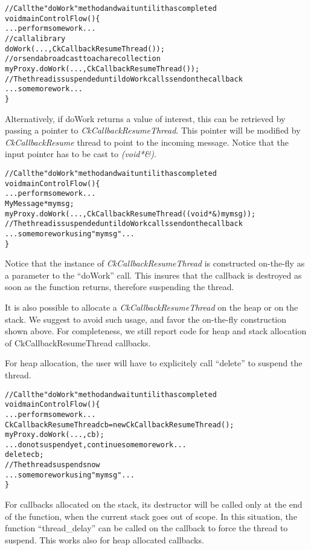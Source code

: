\begin{alltt}
// Call the "doWork" method and wait until it has completed
void mainControlFlow() \{
  ...perform some work...
  // call a library
  doWork(...,CkCallbackResumeThread());
  // or send a broadcast to a chare collection
  myProxy.doWork(...,CkCallbackResumeThread());
  // The thread is suspended until doWork calls send on the callback
  ...some more work...
\}
\end{alltt}

Alternatively, if doWork returns a value of interest, this can be retrieved by
passing a pointer to {\em CkCallbackResumeThread}. This pointer will be modified
by {\em CkCallbackResume} thread to point to the incoming message. Notice that
the input pointer has to be cast to {\em (void*\&)}.

\begin{alltt}
// Call the "doWork" method and wait until it has completed
void mainControlFlow() \{
  ...perform some work...
  MyMessage *mymsg;
  myProxy.doWork(...,CkCallbackResumeThread((void*\&)mymsg));
  // The thread is suspended until doWork calls send on the callback
  ...some more work using "mymsg"...
\}
\end{alltt}

Notice that the instance of {\em CkCallbackResumeThread} is constructed
on-the-fly as a parameter to the ``doWork'' call. This insures that the callback
is destroyed as soon as the function returns, therefore suspending the thread.

It is also possible to allocate a {\em CkCallbackResumeThread} on the heap or on
the stack. We suggest to avoid such usage, and favor the on-the-fly construction
shown above. For completeness, we still report code for heap and stack
allocation of CkCallbackResumeThread callbacks.

For heap allocation, the user will have to explicitely call ``delete'' to
suspend the thread.

\begin{alltt}
// Call the "doWork" method and wait until it has completed
void mainControlFlow() \{
  ...perform some work...
  CkCallbackResumeThread cb = new CkCallbackResumeThread();
  myProxy.doWork(...,cb);
  ...do not suspend yet, continue some more work...
  delete cb;
  // The thread suspends now
  ...some more work using "mymsg"...
\}
\end{alltt}

For callbacks allocated on the stack, its destructor will be called only at the
end of the function, when the current stack goes out of scope. In this
situation, the function ``thread\_delay'' can be called on the callback to
force the thread to suspend. This works also for heap allocated callbacks.

